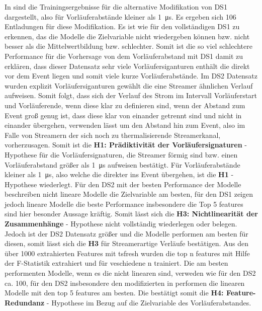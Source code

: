 In  sind die Trainingsergebnisse für die alternative Modifikation von DS1 dargestellt, also für Vorläuferabstände kleiner als \SI{1}{\micro\second}. Es ergeben sich 106 Entladungen für diese Modifikation. Es ist wie für den vollständigen DS1 zu erkennen, das die Modelle die Zielvariable nicht wiedergeben können bzw. nicht besser als die Mittelwertbildung bzw. schlechter. Somit ist die so viel schlechtere Performance für die Vorhersage von dem Vorläuferabstand mit DS1 damit zu erklären, dass dieser Datensatz sehr viele Vorläufersiganturen enthält die direkt vor dem Event liegen und somit viele kurze Vorläuferabstände. Im DS2 Datensatz wurden explizit Vorläufersiganturen gewählt die eine Streamer ähnlichen Verlauf aufweisen. Somit folgt, dass sich der Verlauf des Strom im Intervall Vorläuferstart und Vorläuferende, wenn diese klar zu definieren sind, wenn der Abstand zum Event groß genug ist, dass diese klar von einander getrennt sind und nicht in einander übergehen, verwenden lässt um den Abstand hin zum Event, also im Falle von Streamern der sich noch zu thermalisierende Streamerkanal, vorherzusagen. Somit ist die \textbf{H1: Prädiktivität der Vorläufersignaturen} - Hypothese für die Vorläufersignaturen, die Streamer förmig sind bzw. einen Vorläuferabstand größer als \SI{1}{\micro\second} aufweisen bestätigt. Für Vorläuferabstände kleiner als \SI{1}{\micro\second}, also welche die direkter ins Event übergehen, ist die \textbf{H1} - Hypothese wiederlegt. Für den DS2 mit der besten Performance der Modelle beschreiben nicht lineare Modelle die Zielvariable am besten, für den DS1 zeigen jedoch lineare Modelle die beste Performance insbesondere die Top 5 features sind hier besonder Aussage kräftig. Somit lässt sich die \textbf{H3: Nichtlinearität der Zusammenhänge} - Hypothese nicht vollständig wiederlegen oder belegen. Jedoch ist der DS2 Datensatz größer und die Modelle performen am besten für diesen, somit lässt sich die \textbf{H3} für Streamerartige Verläufe bestätigen. Aus den über 1000 extrahierten Features mit tsfresh wurden die top n features mit Hilfe der F-Statistik extrahiert und für veschiedene n trainiert. Die am besten performenten Modelle, wenn es die nicht linearen sind, verweden wie für den DS2 ca. 100, für den DS2 insbesondere den modifizierten in  performen die linearen Modelle mit den top 5 features am besten. Die bestätigt somit die \textbf{H4: Feature-Redundanz} - Hypothese im Bezug auf die Zielvariable des Vorläuferabstandes. 


